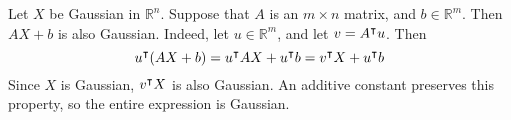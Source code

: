 Let $X$ be Gaussian in $\mathbb R^n$. Suppose that $A$ is an $m \times n$ matrix, and $b \in \mathbb R^m$. Then $AX + b$ is also Gaussian. Indeed, let $u \in \mathbb R^m$, and let $v = A^\intercal u$. Then
\[ u^\intercal(AX + b) = u^\intercal AX + u^\intercal b = v^\intercal X + u^\intercal b \]
Since $X$ is Gaussian, $v^\intercal X$ is also Gaussian. An additive constant preserves this property, so the entire expression is Gaussian.
